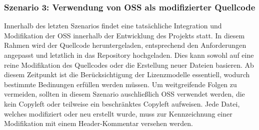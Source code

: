 \subsubsection{Szenario 3: Verwendung von OSS als modifizierter Quellcode}

Innerhalb des letzten Szenarios findet eine tatsächliche Integration und Modifikation der OSS innerhalb der Entwicklung des Projekts statt. In diesem Rahmen wird der Quellcode heruntergeladen, entsprechend den Anforderungen angepasst und letztlich in das Repository hochgeladen. Dies kann sowohl auf eine reine Modifikation des Quellcodes oder die Erstellung neuer Dateien basieren. Ab diesem Zeitpunkt ist die Berücksichtigung der Lizenzmodelle essentiell, wodurch bestimmte Bedinungen erfüllen werden müssen. Um weitgreifende Folgen zu vermeiden, sollten in diesem Szenario auschließlich OSS verwendet werden, die kein Copyleft oder teilweise ein beschränktes Copyleft aufweisen. Jede Datei, welches modifiziert oder neu erstellt wurde, muss zur Kennzeichnung einer Modifikation mit einem Header-Kommentar versehen werden.

